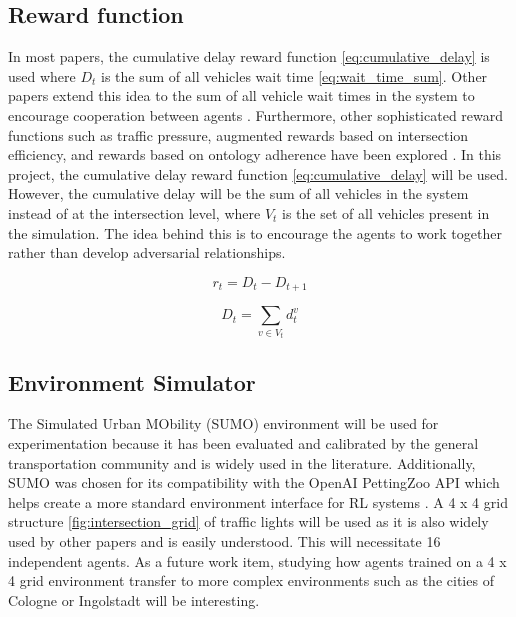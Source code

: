\documentclass[letterpaper]{article} %
\begin{document}
\subsection{Reward function}
In most papers, the cumulative delay reward function \ref{eq:cumulative_delay} is used where \(D_t\) is the sum of all vehicles wait time \ref{eq:wait_time_sum}.
Other papers extend this idea to the sum of all vehicle wait times in the system to encourage cooperation between agents \cite{10.3389/frai.2022.805823}.
Furthermore, other sophisticated reward functions such as traffic pressure, augmented rewards based on intersection efficiency, and rewards based on ontology adherence have been explored \cite{ault2021reinforcement} \cite{Ghanadbashi2023}.
In this project, the cumulative delay reward function \ref{eq:cumulative_delay} will be used.
However, the cumulative delay will be the sum of all vehicles in the system instead of at the intersection level, where \(V_t\) is the set of all vehicles present in the simulation.
The idea behind this is to encourage the agents to work together rather than develop adversarial relationships.

\begin{equation}
r_t = D_t - D_{t+1}
\label{eq:cumulative_delay}
\end{equation}

\begin{equation}
D_t = \sum_{v \in V_t} d_t^v
\label{eq:wait_time_sum}
\end{equation}

\subsection{Environment Simulator}
The Simulated Urban MObility (SUMO) environment will be used for experimentation because it has been evaluated and calibrated by the general transportation community \cite{ault2021reinforcement} \cite{sumorl} and is widely used in the literature.
Additionally, SUMO was chosen for its compatibility with the OpenAI PettingZoo API which helps create a more standard environment interface for RL systems \cite{terry2021pettingzoo}.
A 4 x 4 grid structure \ref{fig:intersection_grid} of traffic lights will be used as it is also widely used by other papers \cite{Almeida2022MultiagentRL} and is easily understood.
This will necessitate 16 independent agents.
As a future work item, studying how agents trained on a 4 x 4 grid environment transfer to more complex environments such as the cities of Cologne or Ingolstadt will be interesting.
\end{document}
